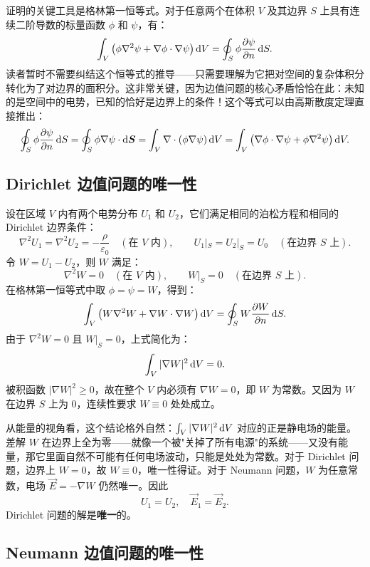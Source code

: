 \subsection[格林第一恒等式]{}

证明的关键工具是格林第一恒等式。对于任意两个在体积 $V$ 及其边界 $S$ 上具有连续二阶导数的标量函数 $\phi$ 和 $\psi$，有：
\[\int_V \left( \phi \nabla^2 \psi + \nabla \phi \cdot \nabla \psi \right) \dif V = \oint_S \phi \frac{\partial \psi}{\partial n} \dif S.\]
读者暂时不需要纠结这个恒等式的推导——只需要理解为它把对空间的复杂体积分转化为了对边界的面积分。这非常关键，因为边值问题的核心矛盾恰恰在此：未知的是空间中的电势，已知的恰好是边界上的条件！这个等式可以由高斯散度定理直接推出：
\[\oint_S \phi \frac{\partial \psi}{\partial n} \dif S = \oint_S \phi \nabla \psi \cdot \dif \vec{S} = \int_V \nabla \cdot (\phi \nabla \psi) \dif V = \int_V \left( \nabla \phi \cdot \nabla \psi + \phi \nabla^2 \psi \right) \dif V.\]

\subsection{Dirichlet 边值问题的唯一性}

设在区域 $V$ 内有两个电势分布 $U_1$ 和 $U_2$，它们满足相同的泊松方程和相同的 Dirichlet 边界条件：
\[\nabla^2 U_1 = \nabla^2 U_2 = -\frac{\rho}{\varepsilon_0} \quad (\text{在 } V \text{ 内}), \qquad U_1|_S = U_2|_S = U_0 \quad (\text{在边界 } S \text{ 上}).\]
令 $W = U_1 - U_2$，则 $W$ 满足：
\[\nabla^2 W = 0 \quad (\text{在 } V \text{ 内}), \qquad W|_S = 0 \quad (\text{在边界 } S \text{ 上}).\]
在格林第一恒等式中取 $\phi = \psi = W$，得到：
\[\int_V \left( W \nabla^2 W + \nabla W \cdot \nabla W \right) \dif V = \oint_S W \frac{\partial W}{\partial n} \dif S.\]
由于 $\nabla^2 W = 0$ 且 $W|_S = 0$，上式简化为：
\[\int_V |\nabla W|^2 \dif V = 0.\]
被积函数 $|\nabla W|^2 \ge 0$，故在整个 $V$ 内必须有 $\nabla W = 0$，即 $W$ 为常数。又因为 $W$ 在边界 $S$ 上为 $0$，连续性要求 $W \equiv 0$ 处处成立。

从能量的视角看，这个结论格外自然：$\int_V |\nabla W|^2 \dif V$ 对应的正是静电场的能量。差解 $W$ 在边界上全为零——就像一个被"关掉了所有电源"的系统——又没有能量，那它里面自然不可能有任何电场波动，只能是处处为常数。对于 Dirichlet 问题，边界上 $W=0$，故 $W \equiv 0$，唯一性得证。对于 Neumann 问题，$W$ 为任意常数，电场 $\vec{E} = -\nabla W$ 仍然唯一。因此
\[U_1 = U_2, \quad \vec{E}_1 = \vec{E}_2.\]
Dirichlet 问题的解是\textbf{唯一}的。

\subsection{Neumann 边值问题的唯一性}

